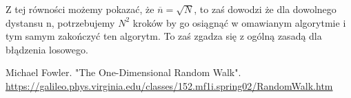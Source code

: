 \documentclass[12pt,oneside,a4paper]{book} %
\theoremstyle{break}
\begin{document}
Z tej równości możemy pokazać, że $\overline{n} = \sqrt{N}$, to zaś dowodzi że dla dowolnego dystansu n, potrzebujemy $N^2$ kroków by go osiągnąć w omawianym algorytmie i tym samym zakończyć ten algorytm. To zaś zgadza się z ogólną zasadą dla błądzenia losowego.

\begin{thebibliography}{00}
  Michael Fowler. "The One-Dimensional Random Walk". \url{https://galileo.phys.virginia.edu/classes/152.mf1i.spring02/RandomWalk.htm}
\end{thebibliography}
\end{document}
